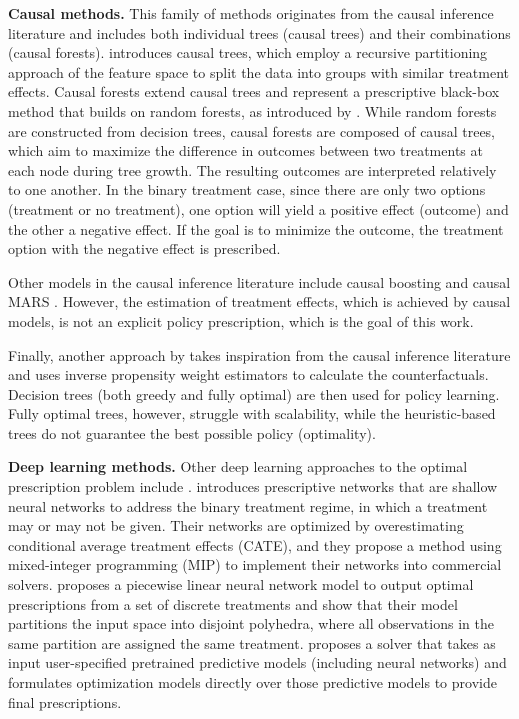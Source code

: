 \documentclass[10pt]{article} %
\begin{document}
\textbf{Causal methods.} This family of methods originates from the causal inference literature and includes both individual trees (causal trees) and their combinations (causal forests). \citet{athey} introduces causal trees, which employ a recursive partitioning approach of the feature space to split the data into groups with similar treatment effects. Causal forests extend causal trees and represent a prescriptive black-box method that builds on random forests, as introduced by \citet{causal-forests}. While random forests are constructed from decision trees, causal forests are composed of causal trees, which aim to maximize the difference in outcomes between two treatments at each node during tree growth. The resulting outcomes are interpreted relatively to one another. In the binary treatment case, since there are only two options (treatment or no treatment), one option will yield a positive effect (outcome) and the other a negative effect. If the goal is to minimize the outcome, the treatment option with the negative effect is prescribed.

Other models in the causal inference literature include causal boosting \citep{powers_qian_jung_schuler_shah_hastie_tibshirani_2018} and causal MARS \citep{powers_qian_jung_schuler_shah_hastie_tibshirani_2018}. However, the estimation of treatment effects, which is achieved by causal models, is not an explicit policy prescription, which is the goal of this work. 

Finally, another approach by \citet{Zhou_Athey_Wager_2023} takes inspiration from the causal inference literature and uses inverse propensity weight estimators to calculate the counterfactuals. Decision trees (both greedy and fully optimal) are then used for policy learning. Fully optimal trees, however, struggle with scalability, while the heuristic-based trees do not guarantee the best possible policy (optimality).

\textbf{Deep learning methods.}
Other deep learning approaches to the optimal prescription problem include \citet{other-pnn, asterios}. \citet{other-pnn} introduces prescriptive networks that are shallow neural networks to address the binary treatment regime, in which a treatment may or may not be given. Their networks are optimized by overestimating conditional average treatment effects (CATE), and they propose a method using mixed-integer programming (MIP) to implement their networks into commercial solvers. \citet{asterios} proposes a piecewise linear neural network model to output optimal prescriptions from a set of discrete treatments and show that their model partitions the input space into disjoint polyhedra, where all observations in the same partition are assigned the same treatment. \citet{bergman2022janos} proposes a solver that takes as input user-specified pretrained predictive models (including neural networks) and formulates optimization models directly over those predictive models to provide final prescriptions. 
\end{document}
